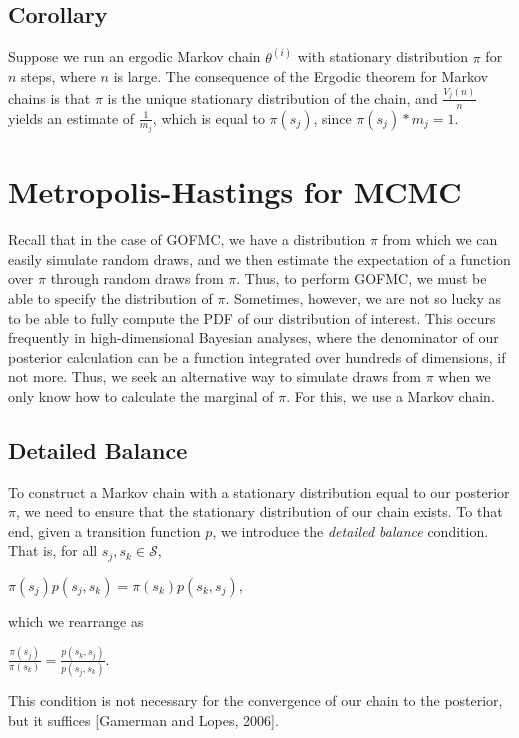 \documentclass[12pt,twoside]{reedthesis}
\begin{document}
		\subsection*{Corollary}
		Suppose we run an ergodic Markov chain $\theta^{(i)}$ with stationary distribution $\pi$ for $n$ steps, where $n$ is large. The consequence of the Ergodic theorem for Markov chains is that $\pi$ is the unique stationary distribution of the chain, and $\frac{V_j(n)}{n}$ yields an estimate of $\frac{1}{m_j}$, which is equal to $\pi(s_j)$, since $\pi(s_j) * m_j = 1$.
	\section{Metropolis-Hastings for MCMC}
			Recall that in the case of GOFMC, we have a distribution $\pi$ from which we can easily simulate random draws, and we then estimate the expectation of a function over $\pi$ through random draws from $\pi$. Thus, to perform GOFMC, we must be able to specify the distribution of $\pi$. Sometimes, however, we are not so lucky as to be able to fully compute the PDF of our distribution of interest. This occurs frequently in high-dimensional Bayesian analyses, where the denominator of our posterior calculation can be a function integrated over hundreds of dimensions, if not more. Thus, we seek an alternative way to simulate draws from $\pi$ when we only know how to calculate the marginal of $\pi$. For this, we use a Markov chain.
			
		\subsection*{Detailed Balance}
			To construct a Markov chain with a stationary distribution equal to our posterior $\pi$, we need to ensure that the stationary distribution of our chain exists. 
			To that end, given a transition function $p$, we introduce the {\em detailed balance} condition. 
			That is, for all $s_j, s_k \in \mathcal S$,
			\begin{center}
				$ \pi(s_j) p(s_j,s_k) = \pi(s_k) p(s_k,s_j)$,
			\end{center}
			which we rearrange as
			\begin{center}
				$\displaystyle \frac{\pi(s_j)}{\pi(s_k)} = \frac{p(s_k, s_j)}{p(s_j, s_k)} $.
			\end{center}
			This condition is not necessary for the convergence of our chain to the posterior, but it suffices [Gamerman and Lopes, 2006].
\end{document}
